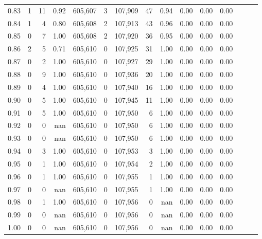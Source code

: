 \begin{tabular}{rrrrrrrrrrrrrrr}
0.83 &       1 &     11 &  0.92 &  605,607 &        3 &  107,909 &       47 &  0.94 &  0.00 &  0.00 &      0.00 \\
0.84 &       1 &      4 &  0.80 &  605,608 &        2 &  107,913 &       43 &  0.96 &  0.00 &  0.00 &      0.00 \\
0.85 &       0 &      7 &  1.00 &  605,608 &        2 &  107,920 &       36 &  0.95 &  0.00 &  0.00 &      0.00 \\
0.86 &       2 &      5 &  0.71 &  605,610 &        0 &  107,925 &       31 &  1.00 &  0.00 &  0.00 &      0.00 \\
0.87 &       0 &      2 &  1.00 &  605,610 &        0 &  107,927 &       29 &  1.00 &  0.00 &  0.00 &      0.00 \\
0.88 &       0 &      9 &  1.00 &  605,610 &        0 &  107,936 &       20 &  1.00 &  0.00 &  0.00 &      0.00 \\
0.89 &       0 &      4 &  1.00 &  605,610 &        0 &  107,940 &       16 &  1.00 &  0.00 &  0.00 &      0.00 \\
0.90 &       0 &      5 &  1.00 &  605,610 &        0 &  107,945 &       11 &  1.00 &  0.00 &  0.00 &      0.00 \\
0.91 &       0 &      5 &  1.00 &  605,610 &        0 &  107,950 &        6 &  1.00 &  0.00 &  0.00 &      0.00 \\
0.92 &       0 &      0 &   nan &  605,610 &        0 &  107,950 &        6 &  1.00 &  0.00 &  0.00 &      0.00 \\
0.93 &       0 &      0 &   nan &  605,610 &        0 &  107,950 &        6 &  1.00 &  0.00 &  0.00 &      0.00 \\
0.94 &       0 &      3 &  1.00 &  605,610 &        0 &  107,953 &        3 &  1.00 &  0.00 &  0.00 &      0.00 \\
0.95 &       0 &      1 &  1.00 &  605,610 &        0 &  107,954 &        2 &  1.00 &  0.00 &  0.00 &      0.00 \\
0.96 &       0 &      1 &  1.00 &  605,610 &        0 &  107,955 &        1 &  1.00 &  0.00 &  0.00 &      0.00 \\
0.97 &       0 &      0 &   nan &  605,610 &        0 &  107,955 &        1 &  1.00 &  0.00 &  0.00 &      0.00 \\
0.98 &       0 &      1 &  1.00 &  605,610 &        0 &  107,956 &        0 &   nan &  0.00 &  0.00 &      0.00 \\
0.99 &       0 &      0 &   nan &  605,610 &        0 &  107,956 &        0 &   nan &  0.00 &  0.00 &      0.00 \\
1.00 &       0 &      0 &   nan &  605,610 &        0 &  107,956 &        0 &   nan &  0.00 &  0.00 &      0.00 \\
\bottomrule
\end{tabular}
